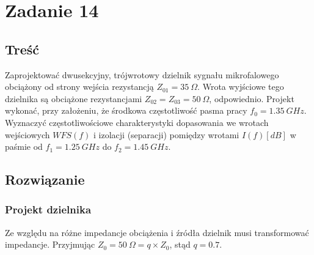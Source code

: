 \documentclass[rep.tex]{subfiles}
\begin{document}
\chapter{Zadanie 14}
\label{zad14}
\section{Treść}
Zaprojektować dwusekcyjny, trójwrotowy dzielnik sygnału mikrofalowego obciążony od strony wejścia rezystancją $Z_{01} = 35~\Omega$.
Wrota wyjściowe tego dzielnika są obciążone rezystancjami $Z_{02} = Z_{03} = 50~\Omega$, odpowiednio.
Projekt wykonać, przy założeniu, że środkowa częstotliwość pasma pracy $f_0 = 1.35~GHz$.
Wyznaczyć częstotliwościowe charakterystyki dopasowania we wrotach wejściowych $WFS(f)$ i izolacji (separacji) pomiędzy wrotami $I(f)[dB]$ w paśmie od $f_1 = 1.25~GHz$ do $f_2 = 1.45~GHz$.

\section{Rozwiązanie}
\subsection{Projekt dzielnika}
Ze względu na różne impedancje obciążenia i źródła dzielnik musi transformować impedancje.
Przyjmując $Z_0 = 50~\Omega = q \times Z_0$, stąd $q = 0.7$.
\end{document}
